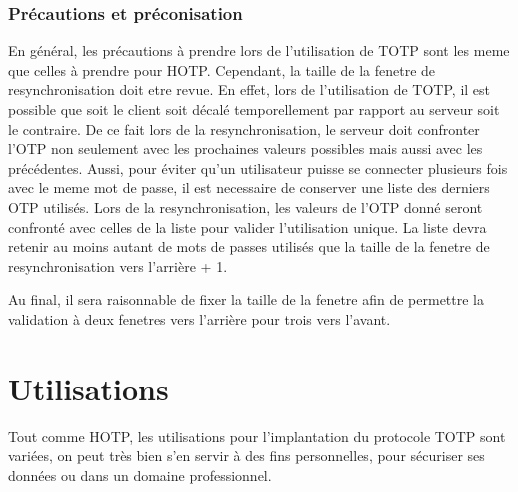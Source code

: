\documentclass{../res/univ-projet}
\begin{document}
    \subsubsection{Précautions et préconisation}
    En général, les précautions à prendre lors de l'utilisation de TOTP sont les meme que celles à prendre pour HOTP. Cependant, la taille de la fenetre de resynchronisation
    doit etre revue. En effet, lors de l'utilisation de TOTP, il est possible que soit le client soit décalé temporellement par rapport au serveur soit le contraire. De ce fait
    lors de la resynchronisation, le serveur doit confronter l'OTP non seulement avec les prochaines valeurs possibles mais aussi avec les précédentes. Aussi, pour éviter qu'un
    utilisateur puisse se connecter plusieurs fois avec le meme mot de passe, il est necessaire de conserver une liste des derniers OTP utilisés. Lors de la resynchronisation, 
    les valeurs de l'OTP donné seront confronté avec celles de la liste pour valider l'utilisation unique. La liste devra retenir au moins autant de mots de passes utilisés que 
    la taille de la fenetre de resynchronisation vers l'arrière + 1.
    
    Au final, il sera raisonnable de fixer la taille de la fenetre afin de permettre la validation à deux fenetres vers l'arrière pour trois vers l'avant.
    
\section{Utilisations}
Tout comme HOTP, les utilisations pour l'implantation du protocole TOTP sont variées, on peut très bien s'en servir à des fins personnelles, pour sécuriser ses données ou 
dans un domaine professionnel.
\end{document}

